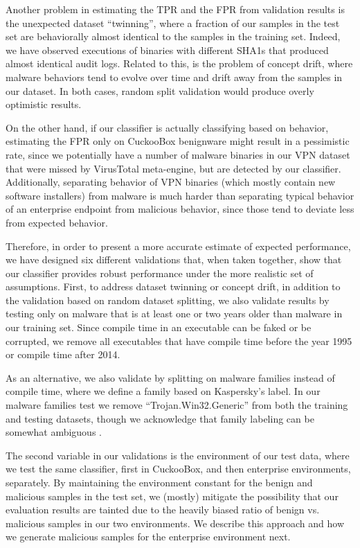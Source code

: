 \documentclass{sig-alternate-2013}
\begin{document}
Another problem in estimating the TPR and the FPR from validation results is the unexpected dataset ``twinning'',  where a fraction of our samples in the test set are behaviorally almost identical to the samples in the training set. Indeed, we have observed executions of binaries with different SHA1s that produced almost identical audit logs. Related to this, is the problem of concept drift, where malware behaviors tend to evolve over time and drift away from the samples in our dataset. In both cases, random split validation would produce overly optimistic results.

On the other hand, if our classifier is actually classifying based on behavior, estimating the FPR only on CuckooBox benignware might result in a pessimistic rate, since we potentially have a number of malware binaries in our VPN dataset that were missed by VirusTotal meta-engine, but are detected by our classifier. Additionally, separating behavior of VPN binaries (which mostly contain new software installers) from malware is much harder than separating typical behavior of an enterprise endpoint from malicious behavior, since those tend to deviate less from expected behavior. 

Therefore, in order to present a more accurate estimate of expected performance, we have designed six different validations that, when taken together,  show that our classifier provides robust performance under the more realistic set of assumptions. First, to address dataset twinning or concept drift, in addition to the validation based on random dataset splitting, we also validate results by testing only on malware that is at least one or two years older than malware in our training set. Since compile time in an executable can be faked or be corrupted, we remove all executables that have compile time before the year 1995 or compile time after 2014.

As an alternative, we also validate by splitting on malware families instead of compile time, where we define a family based on Kaspersky's label. In our malware families test we remove ``Trojan.Win32.Generic'' from both the training and testing datasets, though we acknowledge that family labeling can be somewhat ambiguous \cite{mohaisen2014av}. 

The second variable in our validations is the environment of our test data, where we test the same classifier, first in CuckooBox, and then enterprise environments, separately. By maintaining the environment constant for the benign and malicious samples in the test set, we (mostly) mitigate the possibility that our evaluation results are tainted due to the heavily biased ratio of benign vs. malicious samples in our two environments. We describe this approach and how we generate malicious samples for the enterprise environment next. 
\end{document}
